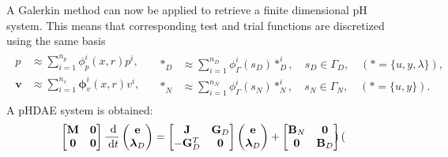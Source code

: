 \documentclass[aspectratio=169]{ISAE-Beamer}
\begin{document}
\begin{frame}
	A Galerkin method can now be applied to retrieve a finite dimensional pH system. This means that corresponding test and trial functions are discretized using the same basis
	\begin{equation*}
	\label{eq:basis_func}
	\begin{aligned}
	\begin{aligned}
	p &\approx \sum_{i=1}^{n_p} \phi_p^i(x, r) p^i, \\
	\bm{v} &\approx \sum_{i=1}^{n_v} \bm\phi_v^i(x, r) v^i, \\
	\end{aligned} \quad
	\begin{aligned}
	*_D &\approx \sum_{i=1}^{n_D} \phi^i_\Gamma(s_D) *^i_D, \quad s_D \in \Gamma_D, \quad (* = \{u, y, \lambda\}), \\
	*_N &\approx \sum_{i=1}^{n_N} \phi_\Gamma^i(s_N) *^i_N, \quad s_N \in \Gamma_N, \quad (* = \{u,  y\}).
	\end{aligned} 
	\end{aligned}
	\end{equation*}
	A pHDAE system is obtained:
	\begin{equation*}
	\begin{aligned}
	\label{eq:discr_phdae}
	\begin{bmatrix}
	\mathbf{M} & \mathbf{0} \\
	\mathbf{0} & \mathbf{0} \\
	\end{bmatrix} \frac{\d}{\d t}
	\begin{pmatrix}
	\mathbf{e}\\
	\bm{\lambda}_D \\
	\end{pmatrix}
	&= \begin{bmatrix}
	\mathbf{J} & \mathbf{G}_D\\
	-\mathbf{G}_D^T & \mathbf{0} \\
	\end{bmatrix}
	\begin{pmatrix}
	\mathbf{e}\\
	\bm{\lambda}_D \\
	\end{pmatrix} + \begin{bmatrix}
	\mathbf{B}_N & \mathbf{0}\\
	\mathbf{0} & \mathbf{B}_D \\
	\end{bmatrix}
	\begin{pmatrix}

\end{pmatrix}
\end{aligned}
\end{equation*}
\end{frame}
\end{document}

